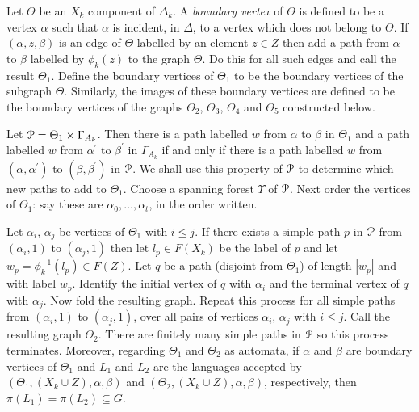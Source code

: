 \documentclass[a4paper,12pt]{article}
\renewcommand{\a}{\alpha }
\renewcommand{\b}{\beta }
\newcommand{\G}{\Gamma }
\newcommand{\D}{\Delta }
\newcommand{\T}{\Theta }
\newcommand{\U}{\Upsilon }
\newcommand{\cP}{{\cal{P}}}
\numberwithin{equation}{section}
\numberwithin{figure}{section}
\begin{document}
Let $\T$ be an $X_k$ component of $\D_k$. A
{\em boundary vertex} of $\T$ is defined to be a vertex
$\a$ such that $\a$ is incident, in $\D$, to a vertex which does not
belong to $\T$.  If $(\a,z,\b)$ is an edge of
$\T$ labelled by an element $z\in Z$ then add a path from $\a$ to
$\b$ labelled by $\phi_k(z)$ to the graph $\T$. Do this for all such edges
and call the result $\T_1$.  Define the boundary vertices of $\T_1$ to be
the boundary vertices of the subgraph $\T$. Similarly, the images of these
boundary vertices are defined to be the boundary vertices of
the graphs $\T_2$, $\T_3$, $\T_4$ and $\T_5$ constructed
below.

 Let $\cP=\T_1\times \G_{A_k}$. Then there is a path
 labelled $w$ from $\a$ to $\b$
in $\T_1$ {\ef {$\T_1$?}}and a path labelled $w$ from $\a^\prime $
to $\b^\prime$ in $\G_{A_k}$ if and only if there is a path
labelled $w$ from $(\a,\a^\prime)$ to $(\b,\b^\prime)$ in $\cP$.
 We shall
use this property of $\cP$ to determine which new paths to add  to
$\T_1$. Choose a spanning  forest $\U$ of  $\cP$. Next
 order the vertices of
$\T_1$: say these are $\a_0,\ldots, \a_t$, in the order written.

Let $\a_i$, $\a_j$ be vertices of  $\T_1$ with $i\le j$. If there
exists a simple path $p$ in $\cP$ from $(\a_i,1)$ to $(\a_j,1)$
then let $l_p\in F(X_k)$ be the label of $p$ and let
$w_p=\phi_k^{-1}(l_p)\in F(Z)$. Let $q$ be a path (disjoint from
$\T_1$) of length $|w_p|$ and with label $w_p$. Identify the
initial vertex of $q$ with $\a_i$ and the terminal vertex of $q$
with $\a_j$. Now fold the resulting graph. Repeat this process for
all simple paths from  $(\a_i,1)$ to $(\a_j,1)$, over all pairs of
vertices $\a_i$, $\a_j$ with $i\le j$. Call the resulting graph
$\T_2$. There are finitely many simple paths in $\cP$ so this
process terminates. Moreover, regarding $\T_1$ and $\T_2$ as
automata, if $\a$ and
 $\b$ are
boundary vertices of $\T_1$ and $L_1$ and $L_2$ are the
languages accepted by $(\T_1,(X_k\cup Z), \a,\b)$ and
$(\T_2,(X_k\cup Z), \a,\b)$, respectively, then $\pi(L_1)=\pi(L_2)\subseteq G$.
\end{document}
